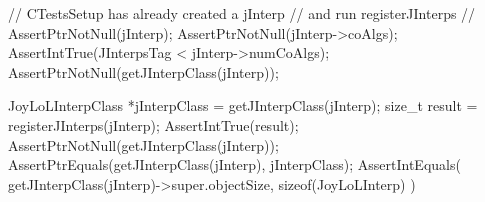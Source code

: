 
\startCTest
  // CTestsSetup has already created a jInterp 
  // and run registerJInterps
  //
  AssertPtrNotNull(jInterp);
  AssertPtrNotNull(jInterp->coAlgs);
  AssertIntTrue(JInterpsTag < jInterp->numCoAlgs);
  AssertPtrNotNull(getJInterpClass(jInterp));
  
  JoyLoLInterpClass *jInterpClass = getJInterpClass(jInterp);
  size_t result = registerJInterps(jInterp);
  AssertIntTrue(result);
  AssertPtrNotNull(getJInterpClass(jInterp));
  AssertPtrEquals(getJInterpClass(jInterp), jInterpClass);
  AssertIntEquals(
    getJInterpClass(jInterp)->super.objectSize,
    sizeof(JoyLoLInterp)
  )
\stopCTest
\stopTestCase
\stopTestSuite

